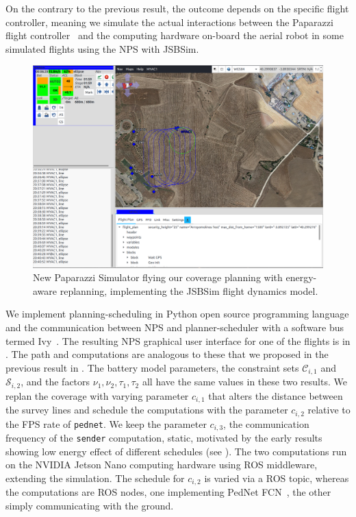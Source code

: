 On the contrary to the previous result, the outcome depends on the specific flight controller, meaning we simulate the actual interactions between the Paparazzi flight controller~\citep{papa} and the computing hardware on-board the aerial robot in some simulated flights using the NPS with JSBSim. 
\begin{figure}[h!]
  \centering
  \includegraphics[width=.7\textwidth]{pictures/paparazzi}
  \caption[New Paparazzi Simulator flying our coverage planning with energy-aware replanning]{New Paparazzi Simulator flying our coverage planning with energy-aware replanning, implementing the JSBSim flight dynamics model.}   
  \label{fig:pprz-screen}
\end{figure}
We implement planning-scheduling in Python open source programming language and the communication between NPS and planner-scheduler with a software bus termed Ivy~\citep{ivybus}. The resulting NPS graphical user interface for one of the flights is in . The path and computations are analogous to these that we proposed in the previous result in . The battery model parameters, the constraint sets $\mathcal{C}_{i,1}$ and $\mathcal{S}_{i,2}$, and the factors $\nu_1,\nu_2,\tau_1,\tau_2$ all have the same values in these two results. We replan the coverage with varying parameter $c_{i,1}$ that alters the distance between the survey lines and schedule the computations with the parameter $c_{i,2}$ relative to the FPS rate of {\small\tt pednet}. We keep the parameter $c_{i,3}$, the communication frequency of the {\small\tt sender} computation, static, motivated by the early results showing low energy effect of different schedules (see ). The two computations run on the NVIDIA Jetson Nano computing hardware using ROS middleware, extending the simulation. The schedule for $c_{i,2}$ is varied via a ROS topic, whereas the computations are ROS nodes, one implementing PedNet FCN~\citep{ullah2018pednet}, the other simply communicating with the ground.

